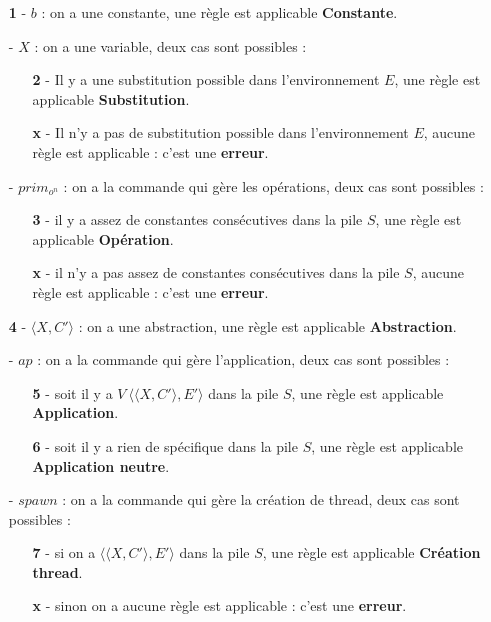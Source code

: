 \documentclass[10pt,a4paper]{report}
\begin{document}
	\begin{enumerate}
		\item[\textbf{1} -] $b$ : on a une constante, une règle est applicable \textbf{Constante}.
		\medbreak
		
		\item[-] $X$ : on a une variable, deux cas sont possibles :
		\begin{enumerate}
			\item[\textbf{2} -] Il y a une substitution possible dans l'environnement $E$, une règle est applicable \textbf{Substitution}.
			\item[\textbf{x} -] Il n'y a pas de substitution possible dans l'environnement $E$, aucune règle est applicable : c'est une \textbf{erreur}.
		\end{enumerate}
		\medbreak
		
		\item[-] $prim_{o^{n}}$ : on a la commande qui gère les opérations, deux cas sont possibles :
		\begin{enumerate}
			\item[\textbf{3} -] il y a assez de constantes consécutives dans la pile $S$, une règle est applicable \textbf{Opération}.
			\item[\textbf{x} -] il n'y a pas assez de constantes consécutives dans la pile $S$, aucune règle est applicable : c'est une \textbf{erreur}.	
		\end{enumerate}
		\medbreak
		
		\item[\textbf{4} -] $\langle X,C'\rangle$ : on a une abstraction, une règle est applicable \textbf{Abstraction}.
		\medbreak
		
		\item[-] $ap$ : on a la commande qui gère l'application, deux cas sont possibles :
		\begin{enumerate}
			\item[\textbf{5} -] soit il y a $V~\langle\langle X,C'\rangle,E'\rangle$ dans la pile $S$, une règle est applicable \textbf{Application}.
			\item[\textbf{6} -] soit il y a rien de spécifique dans la pile $S$, une règle est applicable \textbf{Application neutre}.
		\end{enumerate}
		\medbreak
		
		\item[-] $spawn$ : on a la commande qui gère la création de thread, deux cas sont possibles : 
		\begin{enumerate}
			\item[\textbf{7} -] si on a $\langle\langle X,C'\rangle,E'\rangle$ dans la pile $S$, une règle est applicable \textbf{Création thread}.
			\item[\textbf{x} -] sinon on a aucune règle est applicable : c'est une \textbf{erreur}. 
		\end{enumerate}
		\medbreak
		

\end{enumerate}
\end{document}
